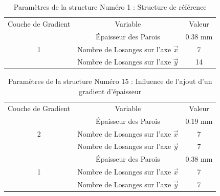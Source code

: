 \documentclass[a4paper]{article}
\begin{document}
	\begin{table}[H]
		\centering
		\begin{tabular}{|c|c|c|}
			\hline
			\rowcolor{Gray}
			\multicolumn{3}{c}{Structure de Référence}\\\hline
			\rowcolor{Gray}
			Couche de Gradient & Variable & Valeur\\
			\hline\hline
			  & \textcolor[rgb]{0,0.5,0}{Épaisseur des Parois} & \textcolor[rgb]{0,0.5,0}{0.38 mm}\\
			\textcolor[rgb]{0,0.5,0}{1} & \textcolor[rgb]{0,0.5,0}{Nombre de Losanges sur l'axe $\vec{x}$} & \textcolor[rgb]{0,0.5,0}{7}\\
			  & \textcolor[rgb]{0,0.5,0}{Nombre de Losanges sur l'axe $\vec{y}$} & \textcolor[rgb]{0,0.5,0}{14}\\
			\hline
		\end{tabular}
		\caption{Paramètres de la structure Numéro 1 : Structure de référence}
	\end{table}

	\begin{table}[H]
		\centering
		\begin{tabular}{|c|c|c|}
			\hline
			\rowcolor{Gray}
			\multicolumn{3}{c}{Structure de Référence}\\\hline
			\rowcolor{Gray}
			Couche de Gradient & Variable & Valeur\\
			\hline\hline
			& \textcolor[rgb]{1,0,0}{Épaisseur des Parois} & \textcolor[rgb]{1,0,0}{0.19 mm}\\
			\textcolor[rgb]{1,0,0}{2} & \textcolor[rgb]{1,0,0}{Nombre de Losanges sur l'axe $\vec{x}$} & \textcolor[rgb]{1,0,0}{7}\\
			& \textcolor[rgb]{1,0,0}{Nombre de Losanges sur l'axe $\vec{y}$} & \textcolor[rgb]{1,0,0}{7}\\
			\hline
			& \textcolor[rgb]{0,0.5,0}{Épaisseur des Parois} & \textcolor[rgb]{0,0.5,0}{0.38 mm}\\
			\textcolor[rgb]{0,0.5,0}{1} & \textcolor[rgb]{0,0.5,0}{Nombre de Losanges sur l'axe $\vec{x}$} & \textcolor[rgb]{0,0.5,0}{7}\\
			& \textcolor[rgb]{0,0.5,0}{Nombre de Losanges sur l'axe $\vec{y}$} & \textcolor[rgb]{0,0.5,0}{7}\\
			\hline
		\end{tabular}
		\caption{Paramètres de la structure Numéro 15 : Influence de l'ajout d'un gradient d'épaisseur}
	\end{table}
	
\end{document}
